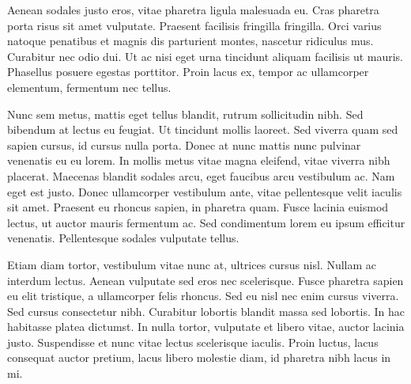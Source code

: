 \documentclass[conference]{IEEEtran}
\begin{document}
Aenean sodales justo eros, vitae pharetra ligula malesuada eu. Cras pharetra porta risus sit amet
vulputate. Praesent facilisis fringilla fringilla. Orci varius natoque penatibus et magnis dis
parturient montes, nascetur ridiculus mus. Curabitur nec odio dui. Ut ac nisi eget urna tincidunt
aliquam facilisis ut mauris. Phasellus posuere egestas porttitor. Proin lacus ex, tempor ac
ullamcorper elementum, fermentum nec tellus.

Nunc sem metus, mattis eget tellus blandit, rutrum sollicitudin nibh. Sed bibendum at lectus eu
feugiat. Ut tincidunt mollis laoreet. Sed viverra quam sed sapien cursus, id cursus nulla porta.
Donec at nunc mattis nunc pulvinar venenatis eu eu lorem. In mollis metus vitae magna eleifend,
vitae viverra nibh placerat. Maecenas blandit sodales arcu, eget faucibus arcu vestibulum ac. Nam
eget est justo. Donec ullamcorper vestibulum ante, vitae pellentesque velit iaculis sit amet.
Praesent eu rhoncus sapien, in pharetra quam. Fusce lacinia euismod lectus, ut auctor mauris
fermentum ac. Sed condimentum lorem eu ipsum efficitur venenatis. Pellentesque sodales vulputate
tellus.

Etiam diam tortor, vestibulum vitae nunc at, ultrices cursus nisl. Nullam ac interdum lectus. Aenean
vulputate sed eros nec scelerisque. Fusce pharetra sapien eu elit tristique, a ullamcorper felis
rhoncus. Sed eu nisl nec enim cursus viverra. Sed cursus consectetur nibh. Curabitur lobortis
blandit massa sed lobortis. In hac habitasse platea dictumst. In nulla tortor, vulputate et libero
vitae, auctor lacinia justo. Suspendisse et nunc vitae lectus scelerisque iaculis. Proin luctus,
lacus consequat auctor pretium, lacus libero molestie diam, id pharetra nibh lacus in mi. 


\balance

\printbibliography
\end{document}

